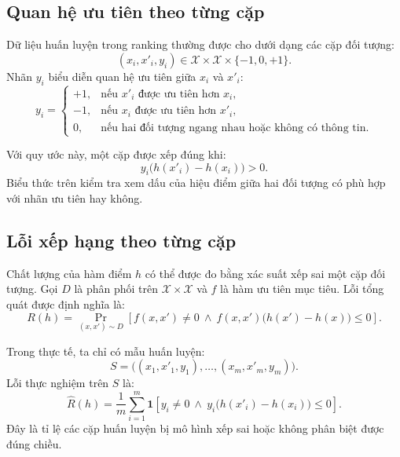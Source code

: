 \subsection{Quan hệ ưu tiên theo từng cặp}

Dữ liệu huấn luyện trong ranking thường được cho dưới dạng các cặp đối tượng:
\[
    (x_i,x'_i,y_i)\in
    \mathcal{X}\times\mathcal{X}\times\{-1,0,+1\}.
\]
Nhãn \(y_i\) biểu diễn quan hệ ưu tiên giữa \(x_i\) và \(x'_i\):
\[
    y_i =
    \begin{cases}
        +1, & \text{nếu } x'_i \text{ được ưu tiên hơn } x_i,\\
        -1, & \text{nếu } x_i \text{ được ưu tiên hơn } x'_i,\\
        0,  & \text{nếu hai đối tượng ngang nhau hoặc không có thông tin.}
    \end{cases}
\]

Với quy ước này, một cặp được xếp đúng khi:
\begin{equation}
    y_i\big(h(x'_i)-h(x_i)\big)>0.
    \label{eq:correct-pairwise-ranking}
\end{equation}
Biểu thức trên kiểm tra xem dấu của hiệu điểm giữa hai đối tượng có phù hợp với nhãn ưu tiên hay không.

\subsection{Lỗi xếp hạng theo từng cặp}

Chất lượng của hàm điểm \(h\) có thể được đo bằng xác suất xếp sai một cặp đối tượng. Gọi \(D\) là phân phối trên \(\mathcal{X}\times\mathcal{X}\) và \(f\) là hàm ưu tiên mục tiêu. Lỗi tổng quát được định nghĩa là:
\begin{equation}
    R(h)
    =
    \Pr_{(x,x')\sim D}
    \left[
        f(x,x')\neq 0
        \ \wedge\
        f(x,x')\big(h(x')-h(x)\big)\leq 0
    \right].
    \label{eq:generalization-pairwise-error}
\end{equation}

Trong thực tế, ta chỉ có mẫu huấn luyện:
\[
    S =
    \big((x_1,x'_1,y_1),\ldots,(x_m,x'_m,y_m)\big).
\]
Lỗi thực nghiệm trên \(S\) là:
\begin{equation}
    \widehat{R}(h)
    =
    \frac{1}{m}
    \sum_{i=1}^{m}
    \mathbf{1}
    \left[
        y_i\neq 0
        \ \wedge\
        y_i\big(h(x'_i)-h(x_i)\big)\leq 0
    \right].
    \label{eq:empirical-pairwise-error}
\end{equation}
Đây là tỉ lệ các cặp huấn luyện bị mô hình xếp sai hoặc không phân biệt được đúng chiều.

